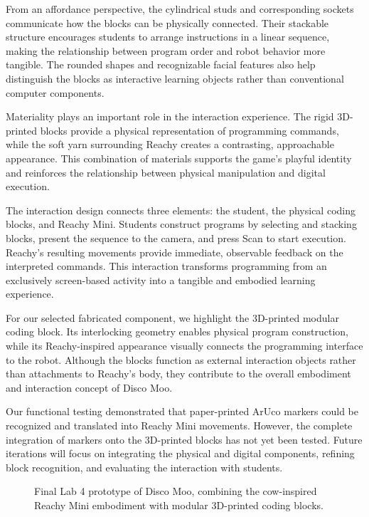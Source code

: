 \documentclass[conference]{IEEEtran}
\newcommand{\fillin}[1]{\textcolor{gray}{\textit{[#1]}}}
\newcommand{\figureplaceholder}[1]{\fbox{\parbox[c][1in][c]{0.92\linewidth}{\centering\fillin{#1}}}}
\begin{document}
From an affordance perspective, the cylindrical studs and corresponding sockets communicate how the blocks can be physically connected. Their stackable structure encourages students to arrange instructions in a linear sequence, making the relationship between program order and robot behavior more tangible. The rounded shapes and recognizable facial features also help distinguish the blocks as interactive learning objects rather than conventional computer components.

Materiality plays an important role in the interaction experience. The rigid 3D-printed blocks provide a physical representation of programming commands, while the soft yarn surrounding Reachy creates a contrasting, approachable appearance. This combination of materials supports the game's playful identity and reinforces the relationship between physical manipulation and digital execution.

The interaction design connects three elements: the student, the physical coding blocks, and Reachy Mini. Students construct programs by selecting and stacking blocks, present the sequence to the camera, and press Scan to start execution. Reachy's resulting movements provide immediate, observable feedback on the interpreted commands. This interaction transforms programming from an exclusively screen-based activity into a tangible and embodied learning experience.

For our selected fabricated component, we highlight the 3D-printed modular coding block. Its interlocking geometry enables physical program construction, while its Reachy-inspired appearance visually connects the programming interface to the robot. Although the blocks function as external interaction objects rather than attachments to Reachy's body, they contribute to the overall embodiment and interaction concept of Disco Moo.

Our functional testing demonstrated that paper-printed ArUco markers could be recognized and translated into Reachy Mini movements. However, the complete integration of markers onto the 3D-printed blocks has not yet been tested. Future iterations will focus on integrating the physical and digital components, refining block recognition, and evaluating the interaction with students.

\begin{figure}[t]
    \centering
    \figureplaceholder{Insert photo of the final Disco Moo prototype.}
    \caption{Final Lab 4 prototype of Disco Moo, combining the cow-inspired Reachy Mini embodiment with modular 3D-printed coding blocks.}
    \label{fig:finalrobot}
\end{figure}
\end{document}
